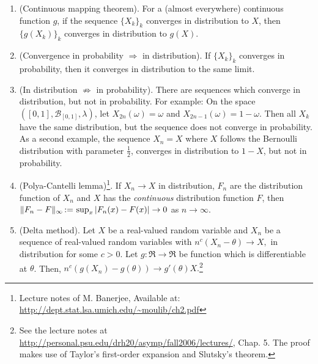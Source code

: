 \documentclass[a4paper,10pt]{article}
\begin{document}
\begin{enumerate}
\item (Continuous mapping theorem). For a (almost everywhere) continuous function $g$, if the sequence $\{X_k\}_k$ 
      converges in distribution to $X$, then $\{g(X_k)\}_k$ converges in distribution to 
      $g(X)$.
      
\item (Convergence in probability $\Rightarrow$ in distribution). If $\{X_k\}_k$ converges in probability,
      then it converges in distribution to the same limit.
      
\item (In distribution $\not\Rightarrow$ in probability). There are sequences which converge in distribution,
      but not in probability. For example: On the space $([0,1], \mathcal{B}_{[0,1]},\lambda)$, let $X_{2n}(\omega)=\omega$
      and $X_{2n-1}(\omega) = 1-\omega$. Then all $X_k$ have the same distribution, but the sequence does not 
      converge in probability. As a second example, the sequence $X_n=X$ where $X$ follows the Bernoulli distribution
      with parameter $\frac{1}{2}$, converges in distribution to $1-X$, but not in probability.
      
\item (Polya-Cantelli lemma)\footnote{Lecture notes of M. Banerjee, Available at: \url{http://dept.stat.lsa.umich.edu/~moulib/ch2.pdf}}. If $X_n\to X$ in distribution, $F_n$ are the distribution function of $X_n$ and 
      $X$ has the \textit{continuous} distribution function $F$, then $\|F_n - F\|_\infty {}\mathop{\mathrel{:}=}{} \sup_{x}|F_n(x) - F(x)| \to 0$
      as $n\to\infty$.
      
\item (Delta method). Let \(X\) be a real-valued random variable and 
\(X_n\) be a sequence of real-valued random variables with 
\(
      n^c (X_n - \theta) \to X,
\)
in distribution for some $c>0$. 
Let $g:\Re\to\Re$ be function which is differentiable at $\theta$. Then,
\(
      n^c(g(X_n) - g(\theta)) \to g'(\theta)X.
\)\footnote{See the lecture notes at \url{http://personal.psu.edu/drh20/asymp/fall2006/lectures/}, Chap. 5.
 The proof makes use of Taylor's first-order expansion and Slutsky's theorem.}
\end{enumerate}
\end{document}
